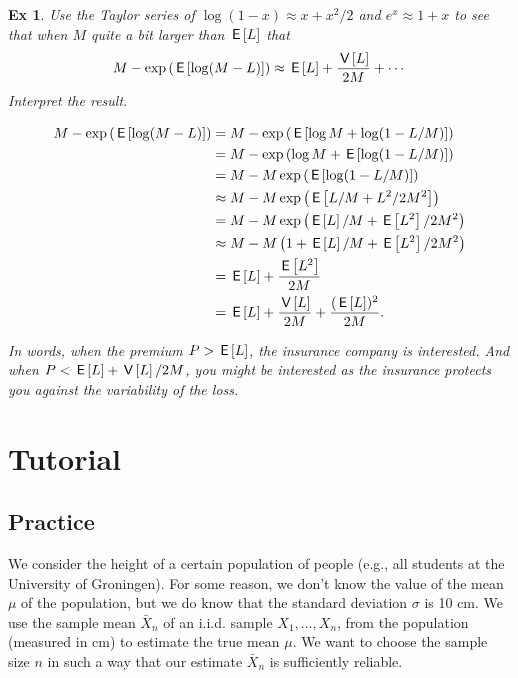 \documentclass[a4paper,11pt]{article}
\newtheorem{exercise}[theorem]{Ex}
\begin{document}
\begin{exercise}
Use the Taylor series of $\log (1-x) \approx x + x^{2}/2$ and $e^{x} \approx 1+x $  to see that when $M$ quite a bit larger than $\,\mathsf{E}\left[L\right]$ that
\begin{equation}
  \label{eq:137}
M - \exp\left(\,\mathsf{E}\left[\log (M-L)\right]\right) \approx \,\mathsf{E}\left[L\right] + \frac{\,\mathsf{V}\left[L\right]}{2 M} + \cdots
\end{equation}
Interpret the result.
\begin{solution}
  \begin{align}
M - \exp\left(\,\mathsf{E}\left[\log (M-L)\right]\right)
&=  M - \exp\left(\,\mathsf{E}\left[\log M + \log (1-L/M)\right]\right)  \\
&=  M - \exp\left(\log M + \,\mathsf{E}\left[\log (1-L/M)\right]\right)  \\
&=  M - M \exp\left(\,\mathsf{E}\left[\log (1-L/M)\right]\right)  \\
&\approx  M - M \exp\left(\,\mathsf{E}\left[ L/M + L^{2}/2M^{2}\right]\right)  \\
&=  M - M \exp\left(\,\mathsf{E}\left[L\right]/M + \,\mathsf{E}\left[L^{2}\right]/2M^{2}\right)  \\
&\approx  M - M \left(1+ \,\mathsf{E}\left[L\right]/M + \,\mathsf{E}\left[L^{2}\right]/2M^{2}\right)  \\
&= \,\mathsf{E}\left[L\right]  + \frac{\,\mathsf{E}\left[L^{2}\right]}{2M} \\
&= \,\mathsf{E}\left[L\right] + \frac{\,\mathsf{V}\left[L\right]}{2M} + \frac{(\,\mathsf{E}\left[L\right])^{2}}{2M}.
  \end{align}

  In words, when the premium $P>\,\mathsf{E}\left[L\right]$, the insurance company is interested.
  And when $P< \,\mathsf{E}\left[L\right] + \,\mathsf{V}\left[L\right]/2M$, you might be interested as the insurance protects you against the \emph{variability} of the loss.

\end{solution}
\end{exercise}


\section{Tutorial}
\label{sec:tutorial}


\subsection{Practice}

We consider the height of a certain population of people (e.g., all students at the University of Groningen). For some reason, we don't know the value of the mean $\mu$ of the population, but we do know that the standard deviation $\sigma$ is 10 cm. We use the sample mean $\bar{X}_n$ of an i.i.d. sample $X_1, \ldots, X_n$, from the population (measured in cm) to estimate the true mean $\mu$.  We want to choose the sample size $n$ in such a way that our estimate $\bar{X}_n$ is sufficiently reliable.
\end{document}
